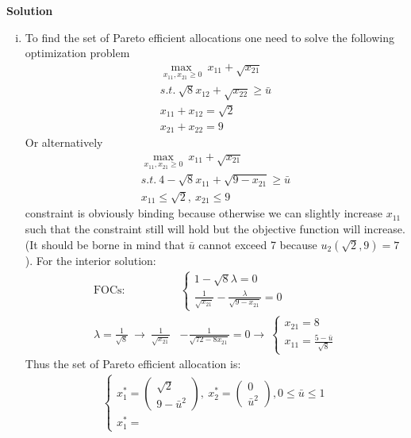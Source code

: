 \documentclass[a4paper]{article}
\begin{document}
\textbf{Solution}
\begin{enumerate}[(i)]
	\item To find the set of Pareto efficient allocations one need to solve the following optimization problem
	\begin{align*}
	\underset{x_{11}, x_{21} \ge 0}{\max\ }\ x_{11} + \sqrt{x_{21}}\\
	s.t.\ \sqrt{8}x_{12} + \sqrt{x_{22}} \ge \bar{u}\\
	x_{11} + x_{12} = \sqrt{2}\\
	x_{21} + x_{22} = 9
	\end{align*}
	Or alternatively
	\begin{align*}
	\underset{x_{11}, x_{21} \ge 0}{\max}\ x_{11} + \sqrt{x_{21}}\\
	s.t.\ 4 - \sqrt{8}x_{11} + \sqrt{9 - x_{21}} \ge \bar{u}\\
	x_{11} \le \sqrt{2},\ x_{21} \le 9
	\end{align*}
	constraint is obviously binding because otherwise we can slightly increase $x_{11}$ such that the constraint still will hold but the objective function will increase.
	(It should be borne in mind that $\bar{u}$ cannot exceed 7 because $u_2(\sqrt{2}, 9) = 7$). For the interior solution:
	\begin{align*}
	\text{FOCs}: &\begin{cases}
	1 - \sqrt{8}\lambda = 0\\
	\frac{1}{\sqrt{x_{21}}} - \frac{\lambda}{\sqrt{9 - x_{21}}} = 0
	\end{cases}\\
	\lambda = \frac{1}{\sqrt{8}}\ \to\ 
	\frac{1}{\sqrt{x_{21}}} &- \frac{1}{\sqrt{72 - 8 x_{21}}} = 0 \to\ \begin{cases} x_{21} = 8\\
	x_{11} = \frac{5 - \bar{u}}{\sqrt{8}}
	\end{cases}
	\end{align*}
	Thus the set of Pareto efficient allocation is:
	\begin{align}\label{eq1}
	\begin{cases}
	x^*_1 = 
	\begin{pmatrix}
	\sqrt{2}\\
	9 - \bar{u}^2
	\end{pmatrix},\ x^*_2 = \begin{pmatrix}
	0\\
	\bar{u}^2
	\end{pmatrix}, 0 \le \bar{u} \le 1\\
	x^*_1 = 

\end{cases}
\end{align}
\end{enumerate}
\end{document}
